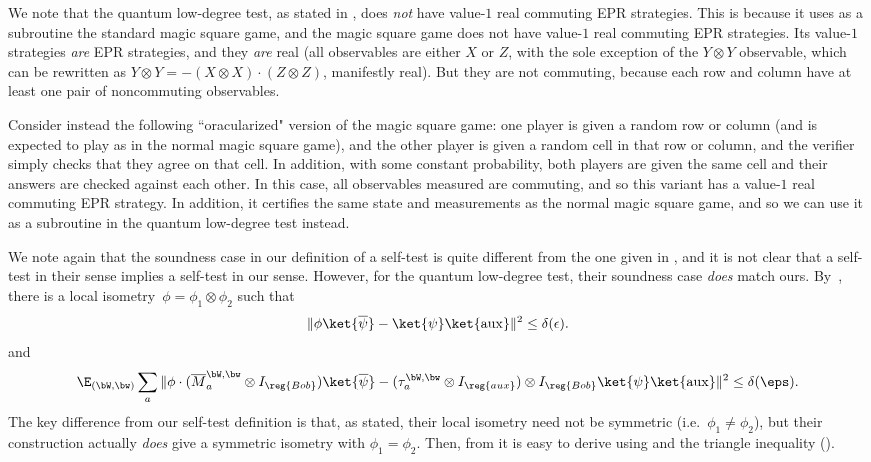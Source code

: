 \begin{remark}
We note that the quantum low-degree test, as stated in \cite{NV18a}, does \emph{not} have value-$1$ real commuting EPR strategies.
This is because it uses as a subroutine the standard magic square game,
and the magic square game does not have value-$1$ real commuting EPR strategies.
Its value-$1$ strategies \emph{are} EPR strategies,
and they \emph{are} real (all observables are either $X$ or $Z$, with the sole exception of the $Y \otimes Y$ observable,
which can be rewritten as $Y \otimes Y = -(X \otimes X) \cdot (Z \otimes Z)$, manifestly real).
But they are not commuting, because each row and column have at least one pair of noncommuting observables.

Consider instead the following ``oracularized" version of the magic square game:
one player is given a random row or column (and is expected to play as in the normal magic square game),
and the other player is given a random cell in that row or column,
and the verifier simply checks that they agree on that cell.
In addition, with some constant probability, both players are given the same cell and their answers are checked against each other.
In this case, all observables measured are commuting, and so this variant has a value-$1$ real commuting EPR strategy.
In addition, it certifies the same state and measurements as the normal magic square game,
and so we can use it as a subroutine in the quantum low-degree test instead.
\end{remark}

\begin{remark}
We note again that the soundness case in our definition of a self-test is quite different from the one given in \cite[Definition~$2.5$]{NV18a},
and it is not clear that a self-test in their sense implies a self-test in our sense.
However, for the quantum low-degree test, their soundness case \emph{does} match ours.
By~\cite[Lemma~$4.1$]{NV18a}, there is a local isometry~$\phi = \phi_1 \otimes \phi_2$ such that
\begin{equation}\label{eq:anand-testing-state}
\Vert \phi \ket{\overline{\psi}} - \ket{\psi}\ket{\mathrm{aux}} \Vert^2 \leq \delta(\epsilon).
\end{equation}
and
\begin{equation}\label{eq:anand-testing-state}
\E_{(\bW, \bw)} \sum_a \Vert \phi \cdot (\overline{M}^{\bW, \bw}_{a} \otimes I_{\reg{Bob}}) \ket{\overline{\psi}}
	 - (\tau_{a}^{\bW, \bw} \otimes I_{\reg{aux}})  \otimes I_{\reg{Bob}} \ket{\psi} \ket{\mathrm{aux}} \Vert^2
\leq \delta(\eps).
\end{equation}
The key difference from our self-test definition is that, as stated, their local isometry need not be symmetric (i.e.\ $\phi_1 \neq \phi_2$),
but their construction actually \emph{does} give a symmetric isometry with $\phi_1 = \phi_2$.
Then, from  it is easy to derive  using  and the triangle inequality ().
\end{remark}

